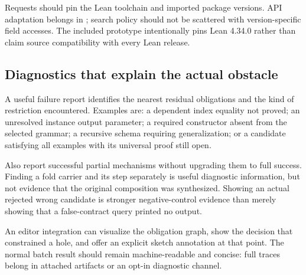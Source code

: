 Requests should pin the Lean toolchain and imported package versions. API
adaptation belongs in ; search policy should not be scattered
with version-specific field accesses. The included prototype intentionally
pins Lean 4.34.0 rather than claim source compatibility with every Lean release.

\subsection{Diagnostics that explain the actual obstacle}

A useful failure report identifies the nearest residual obligations and the
kind of restriction encountered. Examples are: a dependent index equality not
proved; an unresolved instance output parameter; a required constructor absent
from the selected grammar; a recursive schema requiring generalization; or a
candidate satisfying all examples with its universal proof still open.

Also report successful partial mechanisms without upgrading them to full
success. Finding a fold carrier and its step separately is useful diagnostic
information, but not evidence that the original composition was synthesized.
Showing an actual rejected wrong candidate is stronger negative-control
evidence than merely showing that a false-contract query printed no output.

An editor integration can visualize the obligation graph, show the decision
that constrained a hole, and offer an explicit sketch annotation at that point.
The normal batch result should remain machine-readable and concise: full traces
belong in attached artifacts or an opt-in diagnostic channel.
